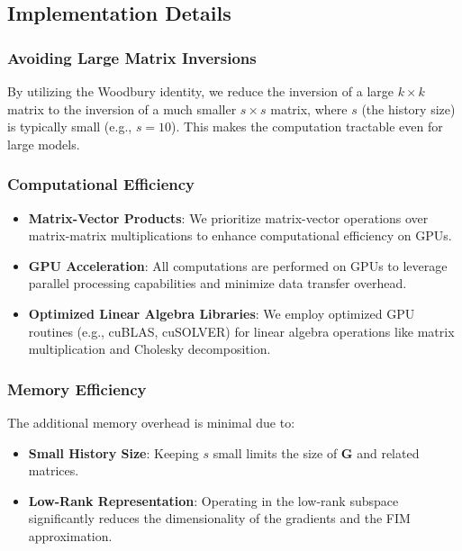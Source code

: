\subsection{Implementation Details}

\subsubsection{Avoiding Large Matrix Inversions}

By utilizing the Woodbury identity, we reduce the inversion of a large $k \times k$ matrix to the inversion of a much smaller $s \times s$ matrix, where $s$ (the history size) is typically small (e.g., $s = 10$). This makes the computation tractable even for large models.

\subsubsection{Computational Efficiency}

\begin{itemize}
    \item \textbf{Matrix-Vector Products}: We prioritize matrix-vector operations over matrix-matrix multiplications to enhance computational efficiency on GPUs.
    \item \textbf{GPU Acceleration}: All computations are performed on GPUs to leverage parallel processing capabilities and minimize data transfer overhead.
    \item \textbf{Optimized Linear Algebra Libraries}: We employ optimized GPU routines (e.g., cuBLAS, cuSOLVER) for linear algebra operations like matrix multiplication and Cholesky decomposition.
\end{itemize}

\subsubsection{Memory Efficiency}

The additional memory overhead is minimal due to:

\begin{itemize}
    \item \textbf{Small History Size}: Keeping $s$ small limits the size of $\mathbf{G}$ and related matrices.
    \item \textbf{Low-Rank Representation}: Operating in the low-rank subspace significantly reduces the dimensionality of the gradients and the FIM approximation.
\end{itemize}

